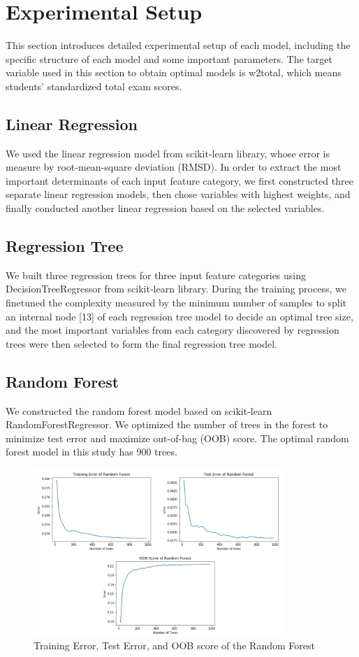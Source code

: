 \documentclass[conference]{IEEEtran}
\begin{document}
\section{Experimental Setup}
This section introduces detailed experimental setup of each model, including the specific structure of each model and some important parameters. The target variable used in this section to obtain optimal models is w2total, which means students' standardized total exam scores. 
\subsection{Linear Regression}
We used the linear regression model from scikit-learn library, whose error is measure by root-mean-square deviation (RMSD). In order to extract the most important determinants of each input feature category, we first constructed three separate linear regression models, then chose variables with highest weights, and finally conducted another linear regression based on the selected variables. 
\subsection{Regression Tree}
We built three regression trees for three input feature categories using DecisionTreeRegressor from scikit-learn library. During the training process, we finetuned the complexity measured by the minimum number of samples to split an internal node [13] of each regression tree model to decide an optimal tree size, and the most important variables from each category discovered by regression trees were then selected to form the final regression tree model.
\subsection{Random Forest}
We constructed the random forest model based on scikit-learn RandomForestRegressor. We optimized the number of trees in the forest to minimize test error and maximize out-of-bag (OOB) score. The optimal random forest model in this study has 900 trees.
\begin{figure}[htbp]
\centerline{\includegraphics[width=9.5cm]{rf_error.jpg}}
\caption{Training Error, Test Error, and OOB score of the Random Forest}
\label{fig}
\end{figure}
\end{document}
